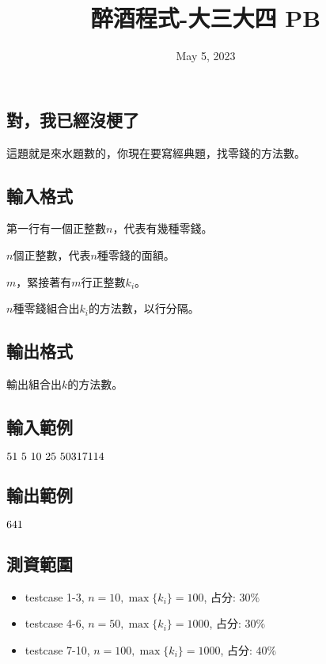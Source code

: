 \documentclass{article}
\title{醉酒程式-大三大四 PB}
\date{May 5, 2023}
\begin{document}
\begin{CJK*}{UTF8}{bsmi}

\maketitle

\section*{對，我已經沒梗了}

這題就是來水題數的，你現在要寫經典題，找零錢的方法數。

\subsection*{輸入格式}
第一行有一個正整數$n$，代表有幾種零錢。

$n$個正整數，代表$n$種零錢的面額。

$m$，緊接著有$m$行正整數$k_i$。

$n$種零錢組合出$k_i$的方法數，以行分隔。

\subsection*{輸出格式}
輸出組合出$k$的方法數。

\subsection*{輸入範例}
$5\\1\ 5\ 10\ 25\ 50\\3\\17\\11\\4$

\subsection*{輸出範例}
$6\\4\\1$

\subsection*{測資範圍}
\begin{itemize}
    \item testcase 1-3, $n=10,\max\{k_i\}=100$, 占分: $30\%$
    \item testcase 4-6, $n=50,\max\{k_i\}=1000$, 占分: $30\%$
    \item testcase 7-10, $n=100,\max\{k_i\}=1000$, 占分: $40\%$
\end{itemize}

\end{CJK*}
\end{document}

